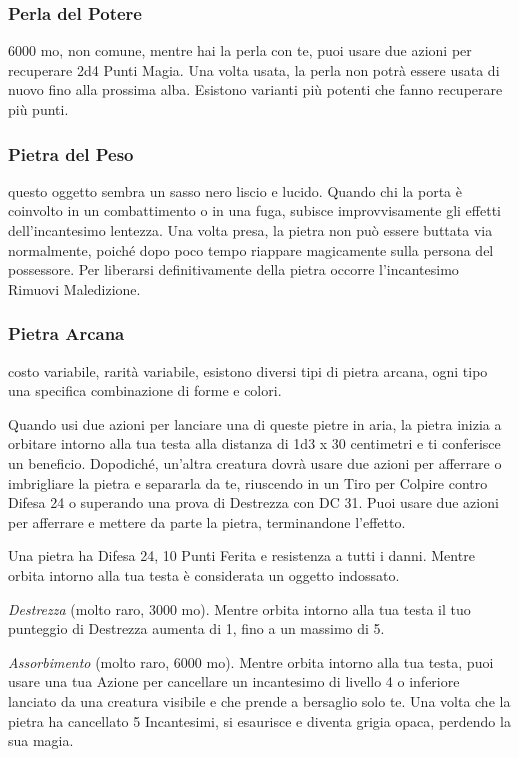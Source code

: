 \begin{multicols}{2}
\subsubsection*{Perla del Potere}
6000 mo, non comune, mentre hai la perla con te, puoi usare due azioni per recuperare 2d4 Punti Magia. Una volta usata, la perla non potrà essere usata di nuovo fino alla prossima alba. Esistono varianti più potenti che fanno recuperare più punti.

\subsubsection*{Pietra del Peso}
questo oggetto sembra un sasso nero liscio e lucido. Quando chi la porta è coinvolto in un combattimento o in una fuga, subisce improvvisamente gli effetti dell’incantesimo lentezza. Una volta presa, la pietra non può essere buttata via normalmente, poiché dopo poco tempo riappare magicamente sulla persona del possessore. Per liberarsi definitivamente della pietra occorre l'incantesimo Rimuovi Maledizione.

\subsubsection*{Pietra Arcana}
costo variabile, rarità variabile, esistono diversi tipi di pietra arcana, ogni tipo una specifica combinazione di forme e colori.

Quando usi due azioni per lanciare una di queste pietre in aria, la pietra inizia a orbitare intorno alla tua testa alla distanza di 1d3 x 30 centimetri e ti conferisce un beneficio.
Dopodiché, un'altra creatura dovrà usare due azioni per afferrare o imbrigliare la pietra e separarla da te, riuscendo in un Tiro per Colpire contro Difesa 24 o superando una prova di Destrezza con DC 31. Puoi usare due azioni per afferrare e mettere da parte la pietra, terminandone l'effetto.

Una pietra ha Difesa 24, 10 Punti Ferita e resistenza a tutti i danni. Mentre orbita intorno alla tua testa è considerata un oggetto indossato.

\textit{Destrezza} (molto raro, 3000 mo). Mentre orbita intorno alla tua testa il tuo punteggio di Destrezza aumenta di 1, fino a un massimo di 5.

\textit{Assorbimento} (molto raro, 6000 mo). Mentre orbita intorno alla tua testa, puoi usare una tua Azione per cancellare un incantesimo di livello 4 o inferiore lanciato da una creatura visibile e che prende a bersaglio solo te. Una volta che la pietra ha cancellato 5 Incantesimi, si esaurisce e diventa grigia opaca, perdendo la sua magia.


\end{multicols}
